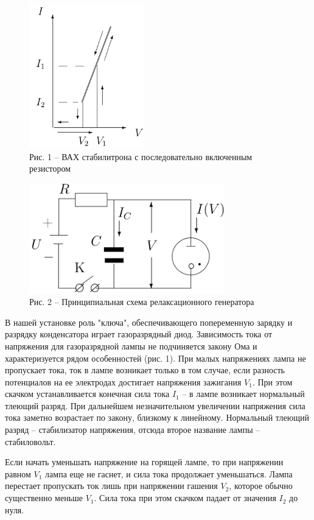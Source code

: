 \documentclass[a4paper,14pt]{article}
\begin{document}
\begin{figure}[!h]
	\parbox[!h]{0.5\textwidth}{\null
		\centering
		\includegraphics[width = 5cm]{1} \\
		Рис. 1 -- ВАХ стабилитрона с последовательно включенным резистором}
	\parbox[!h]{0.5\textwidth}{\null
		\centering
		\includegraphics[width = 8.5cm]{2} \\
		Рис. 2 -- Принципиальная схема релаксационного генератора}
\end{figure}

В нашей установке роль "ключа", обеспечивающего попеременную зарядку и разрядку конденсатора играет газоразрядный диод. Зависимость тока от напряжения для газоразрядной лампы не подчиняется закону Ома и характеризуется рядом особенностей (рис. 1). При малых напряжениях лампа не пропускает тока, ток в лампе возникает только в том случае, если разность потенциалов на ее электродах достигает напряжения зажигания $V_1$. При этом скачком устанавливается конечная сила тока $I_1$ -- в лампе возникает нормальный тлеющий разряд. При дальнейшем незначительном увеличении напряжения сила тока заметно возрастает по закону, близкому к линейному. Нормальный тлеющий разряд -- стабилизатор напряжения, отсюда второе название лампы -- стабиловольт. 

Если начать уменьшать напряжение на горящей лампе, то при напряжении равном $V_1$ лампа еще не гаснет, и сила тока продолжает уменьшаться. Лампа перестает пропускать ток лишь при напряжении гашения $V_2$, которое обычно существенно меньше $V_1$. Сила тока при этом скачком падает от значения $I_2$ до нуля.
\end{document}
